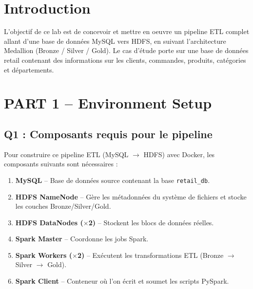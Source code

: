 \documentclass{RapportINPTCLOUD}
\begin{document}
\fairemarges
\fairepagedegarde
\tabledematieres

\section{Introduction}

L'objectif de ce lab est de concevoir et mettre en oeuvre un pipeline ETL complet allant d'une base de donn\'{e}es MySQL vers HDFS, en suivant l'architecture Medallion (Bronze / Silver / Gold). Le cas d'\'{e}tude porte sur une base de donn\'{e}es retail contenant des informations sur les clients, commandes, produits, cat\'{e}gories et d\'{e}partements.

\section{PART 1 -- Environment Setup}

\subsection{Q1 : Composants requis pour le pipeline}

Pour construire ce pipeline ETL (MySQL $\rightarrow$ HDFS) avec Docker, les composants suivants sont n\'{e}cessaires :

\begin{enumerate}[leftmargin=2em]
    \item \textbf{MySQL} -- Base de donn\'{e}es source contenant la base \texttt{retail\_db}.
    \item \textbf{HDFS NameNode} -- G\`{e}re les m\'{e}tadonn\'{e}es du syst\`{e}me de fichiers et stocke les couches Bronze/Silver/Gold.
    \item \textbf{HDFS DataNodes ($\times$2)} -- Stockent les blocs de donn\'{e}es r\'{e}elles.
    \item \textbf{Spark Master} -- Coordonne les jobs Spark.
    \item \textbf{Spark Workers ($\times$2)} -- Ex\'{e}cutent les transformations ETL (Bronze $\rightarrow$ Silver $\rightarrow$ Gold).
    \item \textbf{Spark Client} -- Conteneur o\`{u} l'on \'{e}crit et soumet les scripts PySpark.
\end{enumerate}
\end{document}
